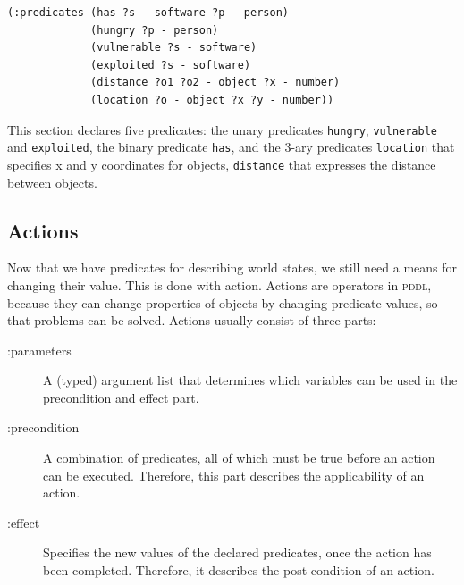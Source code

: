 \documentclass[a4paper,12pt]{report}
\begin{document}
\begin{listing}[H]
\begin{verbatim}
(:predicates (has ?s - software ?p - person)
             (hungry ?p - person)
             (vulnerable ?s - software)
             (exploited ?s - software)
             (distance ?o1 ?o2 - object ?x - number)
             (location ?o - object ?x ?y - number))
\end{verbatim}
\caption{This section declares five predicates: the unary predicates \texttt{hungry}, \texttt{vulnerable} and \texttt{exploited}, the binary predicate \texttt{has}, and the 3-ary predicates \texttt{location} that specifies x and y coordinates for objects, \texttt{distance} that expresses the distance between objects.}
\end{listing}
\subsection{Actions}
\label{sec-2-2-5}

Now that we have predicates for describing world states, we still need
a means for changing their value. This is done with action. Actions
are operators in \textsc{pddl}, because they can change properties of
objects by changing predicate values, so that problems can be solved.
Actions usually consist of three parts:

\begin{description}
\item[{:parameters}] A (typed) argument list that determines which
variables can be used in the precondition and effect
part.

\item[{:precondition}] A combination of predicates, all of which must be
true before an action can be executed. Therefore,
this part describes the applicability of an action.

\item[{:effect}] Specifies the new values of the declared predicates, once
the action has been completed. Therefore, it describes
the post-condition of an action.
\end{description}
\end{document}
